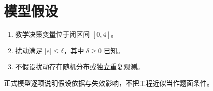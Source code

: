 \section{模型假设}
\begin{enumerate}
\item 教学决策变量位于闭区间 $[0,4]$。
\item 扰动满足 $|e|\leq\delta$，其中 $\delta\geq0$ 已知。
\item 不假设扰动存在随机分布或独立重复观测。
\end{enumerate}
正式模型逐项说明假设依据与失效影响，不把工程近似当作题面条件。
